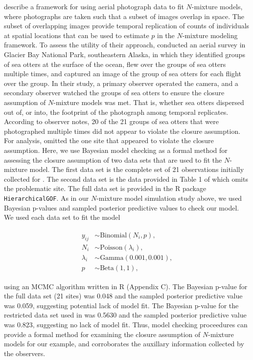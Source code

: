 \documentclass[12pt,english]{article}
\begin{document}
\begin{spacing}{1.9}
\cite{williams2017estimating} describe a framework for using
aerial photograph data to fit $N$-mixture models, where
photographs are taken such that a subset of images overlap in
space. The subset of overlapping images provide temporal
replication of counts of individuals at spatial locations that can
be used to estimate $p$ in the $N$-mixture modeling framework. To
assess the utility of their approach,
\cite{williams2017estimating} conducted an aerial survey in
Glacier Bay National Park, southeastern Alaska, in which they
identified groups of sea otters at the surface of the ocean, flew
over the groups of sea otters multiple times, and captured an
image of the group of sea otters for each flight over the
group. In their study, a primary observer operated the camera, and
a secondary observer watched the groups of sea otters to ensure
the closure assumption of $N$-mixture models was met. That is,
whether sea otters dispersed out of, or into, the footprint of the
photograph among temporal replicates. According to observer notes,
20 of the 21 groups of sea otters that were photographed multiple times did not
appear to violate the closure assumption. For analysis, \citet{williams2017estimating}
omitted the one site that appeared to violate the closure assumption. Here, we use Bayesian
model checking as a formal method for assessing the closure
assumption of two data sets that are used to fit the $N$-mixture
model. The first data set is the complete set of 21 observations
initially collected for \citet{williams2017estimating}. The second data set is the data provided in Table 1 of
\citet{williams2017estimating} which omits the
problematic site. The full data set is provided in the R package
\texttt{HierarchicalGOF}. As in our $N$-mixture model simulation
study above, we used Bayesian p-values and sampled posterior
predictive values to check our model. We used each data set to fit
the model
\begin{linenomath}
  \begin{align}
    \begin{split}
      y_{ij} & \sim \text{Binomial}(N_{i},p),\\
      N_{i} & \sim \text{Poisson}(\lambda_{i}), \\
      \lambda_i & \sim
      \text{Gamma}(0.001,0.001), \\
      p & \sim \text{Beta}(1,1),
    \end{split} \nonumber
          \label{eq:nmix2}
  \end{align}
\end{linenomath}
using an MCMC algorithm written in R (Appendix C). The Bayesian
p-value for the full data set (21 sites) was 0.048 and the sampled
posterior predictive value was 0.059, suggesting
potential lack
of model fit. The Bayesian p-value for the restricted data set
used in \citet{williams2017estimating} was 0.5630 and the sampled
posterior predictive value was 0.823, suggesting no
lack of model fit. Thus, model checking proceedures can provide a formal method for
examining the closure assumption of $N$-mixture models for our
example, and corroborates the auxillary information collected by
the observers.


\end{spacing}
\end{document}
